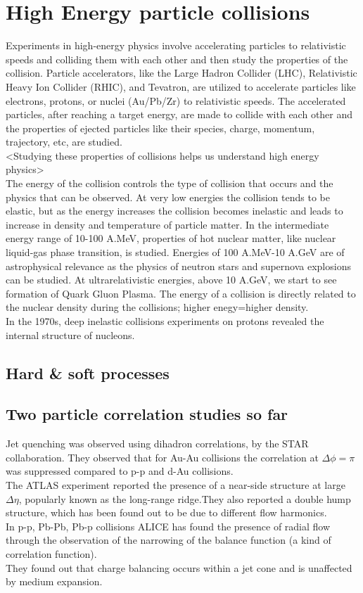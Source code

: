 \documentclass[12pt,a4paper,twoside]{report}
\begin{document}
\section{High Energy particle collisions}
Experiments in high-energy physics involve accelerating particles to relativistic speeds and colliding them with each other and then study the properties of the collision. Particle accelerators, like the Large Hadron Collider (LHC), Relativistic Heavy Ion Collider (RHIC), and Tevatron, are utilized to accelerate particles like electrons, protons, or nuclei (Au/Pb/Zr) to relativistic speeds. The accelerated particles, after reaching a target energy, are made to collide with each other and the properties of ejected particles like their species, charge, momentum, trajectory, etc, are studied.\\
<Studying these properties of collisions helps us understand high energy physics>\\
The energy of the collision controls the type of collision that occurs and the physics that can be observed. At very low energies the collision tends to be elastic, but as the energy increases the collision becomes inelastic and leads to increase in density and temperature of particle matter. In the intermediate energy range of 10-100 A.MeV, properties of hot nuclear matter, like nuclear liquid-gas phase transition, is studied. Energies of 100 A.MeV-10 A.GeV are of astrophysical relevance as the physics of neutron stars and supernova explosions can be studied. At ultrarelativistic energies, above 10 A.GeV, we start to see formation of Quark Gluon Plasma.
The energy of a collision is directly related to the nuclear density during the collisions; higher enegy=higher density.\\
In the 1970s, deep inelastic collisions experiments on protons revealed the internal structure of nucleons.\\
\subsection{Hard \& soft processes}
\subsection{Two particle correlation studies so far}
Jet quenching was observed using dihadron correlations, by the STAR collaboration. They observed that for Au-Au collisions the correlation at $\Delta\phi=\pi$ was suppressed compared to p-p and d-Au collisions.\\
The ATLAS experiment reported the presence of a near-side structure at large $\Delta\eta$, popularly known as the long-range ridge.They also reported a double hump structure, which has been found out to be due to different flow harmonics.\\
In p-p, Pb-Pb, Pb-p collisions ALICE has found the presence of radial flow through the observation of the narrowing of the balance function (a kind of correlation function).\\ They found out that charge balancing occurs within a jet cone and is unaffected by medium expansion.\\
\end{document}
